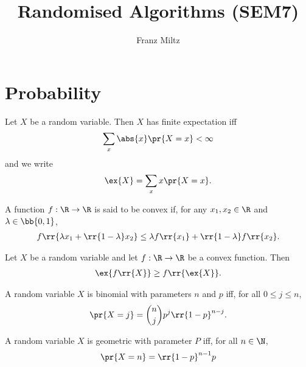 \documentclass{article}
\title{Randomised Algorithms (SEM7)}
\author{Franz Miltz}
\begin{document}
\maketitle
\tableofcontents
\pagebreak

\section{Probability}

\begin{definition}
  \label{def:expectation}
  Let $X$ be a random variable. Then $X$ has finite expectation iff
  \begin{align*}
    \sum_{x} \abs{x} \pr{X=x} < \infty
  \end{align*}
  and we write
  \begin{align*}
    \ex{X} = \sum_{x} x \pr{X=x}.
  \end{align*}
\end{definition}

\begin{definition}
  \label{def:convex}
  A function $f:\R\to\R$ is said to be convex if, for any $x_1,x_2\in\R$
  and $\lambda\in\bb{0,1}$,
  \begin{align*}
    f\rr{\lambda x_1 + \rr{1-\lambda}x_2} \leq \lambda f\rr{x_1} + \rr{1-\lambda}f \rr{x_2}.
  \end{align*}
\end{definition}

\begin{theorem}
  \label{thm:jensens}
  Let $X$ be a random variable and let $f:\R\to\R$ be a convex function. Then
  \begin{align*}
    \ex{f\rr{X}} \geq f\rr{\ex{X}}.
  \end{align*}
\end{theorem}

\begin{definition}
  \label{def:binomial}
  A random variable $X$ is binomial with parameters $n$ and $p$ iff,
  for all $0\leq j\leq n$,
  \begin{align*}
    \pr{X=j}=\binom{n}{j}p^j \rr{1-p}^{n-j}.
  \end{align*}
\end{definition}

\begin{definition}
  \label{def:geometric}
  A random variable $X$ is geometric with parameter $P$ iff, for all $n\in\N$,
  \begin{align*}
    \pr{X=n}=\rr{1-p}^{n-1} p
  \end{align*}
\end{definition}
\end{document}
